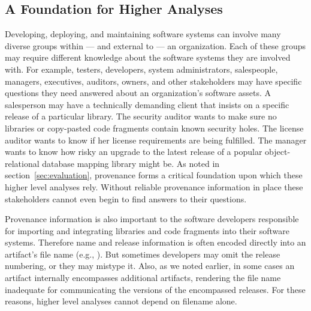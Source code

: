 \subsection{A Foundation for Higher Analyses}

Developing, deploying, and maintaining software systems can involve many
diverse groups within --- and external to --- an organization.  Each of these
groups may require different knowledge about the software systems they are
involved with.  For example, testers, developers, system administrators,
salespeople, managers, executives, auditors, owners, and other stakeholders
may have specific questions they need answered about an organization's
software assets.  A salesperson may have a technically demanding client
that insists on a specific release of a particular library.  The security
auditor wants to make sure no libraries or copy-pasted code fragments
contain known security holes.  The license auditor wants to know if her
license requirements are being fulfilled.  The manager wants to know how
risky an upgrade to the latest release of a popular object-relational
database mapping library might be.  As noted in
section~\ref{sec:evaluation}, provenance forms a critical foundation upon
which these higher level analyses rely.  Without reliable provenance
information in place these stakeholders cannot even begin to find answers
to their questions.


Provenance information is also important to the software developers
responsible for importing and integrating libraries and code fragments into
their software systems.  Therefore name and release information is often
encoded directly into an artifact's file name (e.g., ).
But sometimes developers may omit the release numbering, or they may
mistype it.  Also, as we noted earlier, in some cases an artifact
internally encompasses additional artifacts, rendering the file name
inadequate for communicating the versions of the encompassed releases.  For
these reasons, higher level analyses cannot depend on filename alone.

